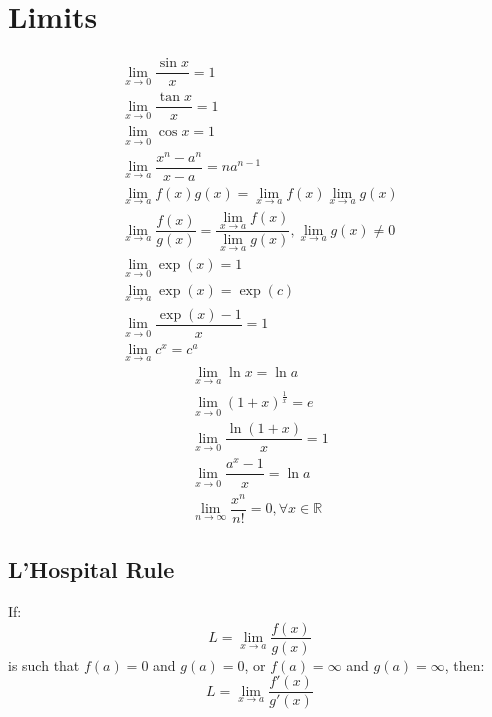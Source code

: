 \chapter{Limits}
\begin{align}
	\lim_{x\to0} \dfrac{\sin x}{x}=1\\
	\lim_{x\to0} \dfrac{\tan x}{x}=1\\
	\lim_{x\to0} \cos x=1\\
	\lim_{x\to a} \dfrac{x^n-a^n}{x-a}=na^{n-1}\\
	\lim_{x\to a} f(x)g(x)=\lim_{x\to a} f(x)\lim_{x\to a} g(x)\\
	\lim_{x\to a} \dfrac{f(x)}{g(x)}=\dfrac{\lim_{x\to a} f(x)}{\lim_{x\to a} g(x)}, \lim_{x\to a} g(x) \neq 0\\
	\lim_{x\to0} \exp(x)=1\\
	\lim_{x\to a} \exp(x)=\exp(c)\\
	\lim_{x\to0} \dfrac{\exp(x)-1}{x}=1\\
	\lim_{x\to a} c^x=c^a
\end{align}
\begin{align}
	\lim_{x\to a} \ln x=\ln a\\
	\lim_{x\to0} (1+x)^{\frac{1}{x}}=e\\
	\lim_{x\to0} \dfrac{\ln (1+x)}{x}=1\\
	\lim_{x\to0} \dfrac{a^x-1}{x}=\ln a\\
	\lim_{n\to\infty} \dfrac{x^n}{n!}=0, \forall x\in\mathbb{R}
\end{align}


\section{L'Hospital Rule}
If:
\begin{equation}
	L=\lim_{x\to a} \dfrac{f(x)}{g(x)}\nonumber
\end{equation}
is such that $f(a)=0$ and $g(a)=0$, or $f(a)=\infty$ and $g(a)=\infty$, then:
\begin{equation}
	L=\lim_{x\to a} \dfrac{f'(x)}{g'(x)}\nonumber
\end{equation}
